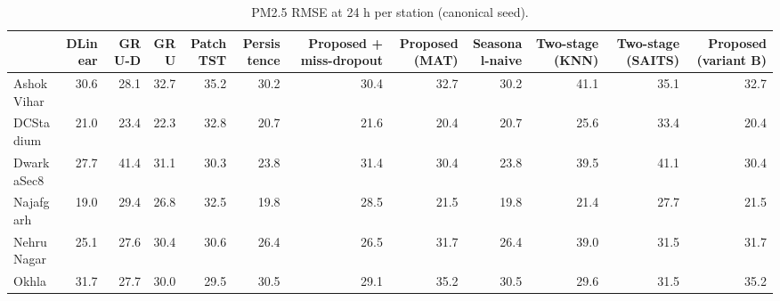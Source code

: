 \begin{table}
\caption{PM2.5 RMSE at 24 h per station (canonical seed).}
\label{tab:station_rmse}
\begin{tabular}{lrrrrrrrrrrr}
\toprule
 & DLinear & GRU-D & GRU & PatchTST & Persistence & Proposed + miss-dropout & Proposed (MAT) & Seasonal-naive & Two-stage (KNN) & Two-stage (SAITS) & Proposed (variant B) \\
\midrule
AshokVihar & 30.6 & 28.1 & 32.7 & 35.2 & 30.2 & 30.4 & 32.7 & 30.2 & 41.1 & 35.1 & 32.7 \\
DCStadium & 21.0 & 23.4 & 22.3 & 32.8 & 20.7 & 21.6 & 20.4 & 20.7 & 25.6 & 33.4 & 20.4 \\
DwarkaSec8 & 27.7 & 41.4 & 31.1 & 30.3 & 23.8 & 31.4 & 30.4 & 23.8 & 39.5 & 41.1 & 30.4 \\
Najafgarh & 19.0 & 29.4 & 26.8 & 32.5 & 19.8 & 28.5 & 21.5 & 19.8 & 21.4 & 27.7 & 21.5 \\
NehruNagar & 25.1 & 27.6 & 30.4 & 30.6 & 26.4 & 26.5 & 31.7 & 26.4 & 39.0 & 31.5 & 31.7 \\
Okhla & 31.7 & 27.7 & 30.0 & 29.5 & 30.5 & 29.1 & 35.2 & 30.5 & 29.6 & 31.5 & 35.2 \\
\bottomrule
\end{tabular}
\end{table}
